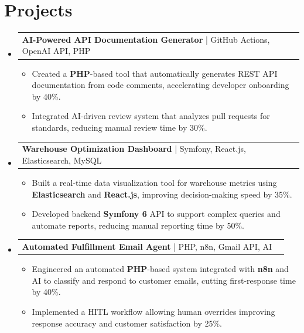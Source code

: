 \documentclass[letterpaper,11pt]{article}
\makeatletter
\newcommand{\resumeItem}[1]{
  \item\footnotesize{
    {#1 \vspace{-2pt}}
  }
}
\newcommand{\resumeProjectHeading}[2]{
    \item
    \begin{tabular*}{1.001\textwidth}{l@{\extracolsep{\fill}}r}
      \small#1 & \textbf{\small #2}\\
    \end{tabular*}\vspace{-7pt}
}
\newcommand{\resumeSubHeadingListStart}{\begin{itemize}[leftmargin=0pt, label={}]}
\newcommand{\resumeSubHeadingListEnd}{\end{itemize}}
\newcommand{\resumeItemListStart}{\begin{itemize}[leftmargin=*]}
\newcommand{\resumeItemListEnd}{\end{itemize}\vspace{-5pt}}
\makeatother
\begin{document}
\section{Projects}
    \vspace{-5pt}
    \resumeSubHeadingListStart
      \resumeProjectHeading
          {\textbf{AI-Powered API Documentation Generator} | GitHub Actions, OpenAI API, PHP}{}
          \resumeItemListStart
              \resumeItem{Created a \textbf{PHP}-based tool that automatically generates REST API documentation from code comments, accelerating developer onboarding by 40\%.}
              \resumeItem{Integrated AI-driven review system that analyzes pull requests for standards, reducing manual review time by 30\%.}
          \resumeItemListEnd
          \vspace{-12pt}
      \resumeProjectHeading
          {\textbf{Warehouse Optimization Dashboard} | Symfony, React.js, Elasticsearch, MySQL}{}
          \resumeItemListStart
              \resumeItem{Built a real-time data visualization tool for warehouse metrics using \textbf{Elasticsearch} and \textbf{React.js}, improving decision-making speed by 35\%.}
              \resumeItem{Developed backend \textbf{Symfony 6} API to support complex queries and automate reports, reducing manual reporting time by 50\%.}
          \resumeItemListEnd
          \vspace{-12pt}
      \resumeProjectHeading
          {\textbf{Automated Fulfillment Email Agent} | PHP, n8n, Gmail API, AI}{}
          \resumeItemListStart
              \resumeItem{Engineered an automated \textbf{PHP}-based system integrated with \textbf{n8n} and AI to classify and respond to customer emails, cutting first-response time by 40\%.}
              \resumeItem{Implemented a HITL workflow allowing human overrides improving response accuracy and customer satisfaction by 25\%.}
          \resumeItemListEnd 
    \resumeSubHeadingListEnd
\end{document}
